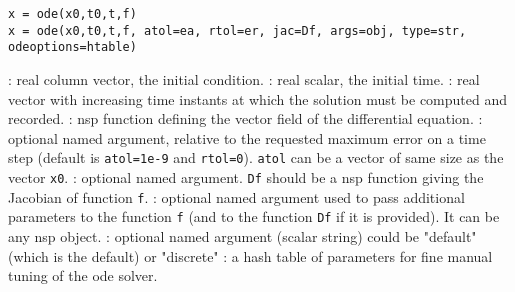 
\begin{mandesc}
\end{mandesc}

\begin{calling_sequence}
\begin{verbatim}
x = ode(x0,t0,t,f)
x = ode(x0,t0,t,f, atol=ea, rtol=er, jac=Df, args=obj, type=str, odeoptions=htable)
\end{verbatim}
\end{calling_sequence}
\begin{parameters}
  \begin{varlist}
    : real column vector, the initial condition.
    : real scalar, the initial time.
    : real vector with increasing time instants at which the solution must be computed and recorded.
    : nsp function defining the vector field of the differential equation.
    : optional named argument, relative to the requested maximum error on a time step 
    (default is \verb+atol=1e-9+ and \verb+rtol=0+). \verb+atol+ can be a vector of same size as 
    the vector \verb+x0+.
    : optional named argument. \verb+Df+ should be a nsp function giving the Jacobian of function \verb+f+.
    : optional named argument used to pass additional parameters to the function \verb+f+ 
    (and to the function \verb+Df+ if it is provided). It can be any nsp object.
    : optional named argument (scalar string) could be "default" (which is the default) or "discrete"
    : a hash table of parameters for fine manual tuning of the ode solver.
  \end{varlist}
\end{parameters}

